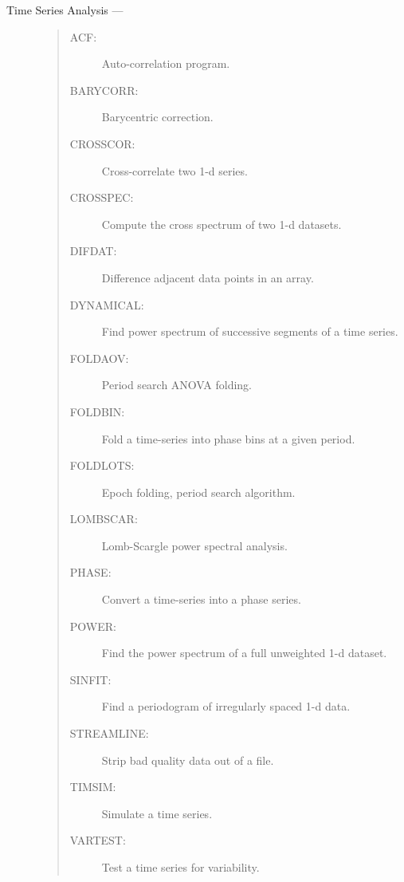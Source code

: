 \begin{description}
\item [Time Series Analysis ---]
\begin{quote}
\begin{description}
\item [ACF:]       Auto-correlation program.
\item [BARYCORR:]  Barycentric correction.
\item [CROSSCOR:]  Cross-correlate two 1-d series.
\item [CROSSPEC:]  Compute the cross spectrum of two 1-d datasets.
\item [DIFDAT:]    Difference adjacent data points in an array.
\item [DYNAMICAL:]  Find power spectrum of successive segments of a time series.
\item [FOLDAOV:]   Period search ANOVA folding.
\item [FOLDBIN:]   Fold a time-series into phase bins at a given period.
\item [FOLDLOTS:]  Epoch folding, period search algorithm.
\item [LOMBSCAR:]  Lomb-Scargle power spectral analysis.
\item [PHASE:]     Convert a time-series into a phase series.
\item [POWER:]     Find the power spectrum of a full unweighted 1-d dataset.
\item [SINFIT:]    Find a periodogram of irregularly spaced 1-d data.
\item [STREAMLINE:]  Strip bad quality data out of a file.
\item [TIMSIM:]    Simulate a time series.
\item [VARTEST:]   Test a time series for variability.
\end{description}
\end{quote}


\end{description}
